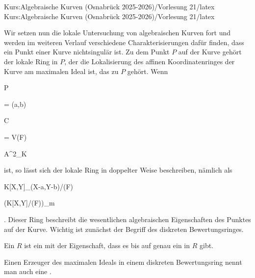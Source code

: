 Kurs:Algebraische Kurven (Osnabrück 2025-2026)/Vorlesung 21/latex
Kurs:Algebraische Kurven (Osnabrück 2025-2026)/Vorlesung 21/latex

\setcounter{section}{21}




Wir setzen nun die lokale Untersuchung von algebraischen Kurven fort und werden im weiteren Verlauf verschiedene Charakterisierungen dafür finden, dass ein Punkt einer Kurve nichtsingulär
 {} {}
ist. Zu dem Punkt $P$ auf der Kurve gehört der lokale Ring in $P$, der die Lokalisierung des affinen Koordinatenringes der Kurve am maximalen Ideal ist, das zu $P$ gehört. Wenn


\mavergleichskette

{\vergleichskette

{P
}

{ = }{ (a,b)
}

{ \in }{ C
}

{ =   }{V(F)
}

{ \subset  }{ {\mathbb A}^{2}_{K}
}

}
{}{}{}
ist, so lässt sich der lokale Ring in doppelter Weise beschreiben, nämlich als


\mavergleichskettedisp

{\vergleichskette

{ K[X,Y]_{(X-a,Y-b)}/(F)
}

{ \cong} { (K[X,Y]/(F))_{\mathfrak m}
}

{ } {
}

{ } {
}

{ } {
}

}
{}{}{}
 {} {.}
Dieser Ring beschreibt die wesentlichen algebraischen Eigenschaften des Punktes auf der Kurve. Wichtig ist zunächst der Begriff des diskreten Bewertungsringes.



{}

{


Ein  $R$ ist ein
mit der Eigenschaft, dass es bis auf
genau ein
in $R$ gibt.


}


Einen Erzeuger des maximalen Ideals in einem diskreten Bewertungsring nennt man auch eine  {.}


